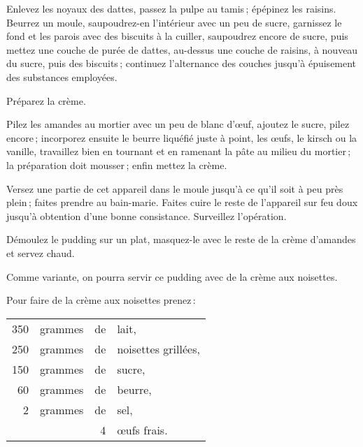 Enlevez les noyaux des dattes, passez la pulpe au tamis ; épépinez les raisins.
Beurrez un moule, saupoudrez-en l'intérieur avec un peu de sucre, garnissez le
fond et les parois avec des biscuits à la cuiller, saupoudrez encore de sucre,
puis mettez une couche de purée de dattes, au-dessus une couche de raisins,
à nouveau du sucre, puis des biscuits ; continuez l'alternance des couches
jusqu'à épuisement des substances employées.

Préparez la crème.

Pilez les amandes au mortier avec un peu de blanc d'œuf, ajoutez le sucre,
pilez encore ; incorporez ensuite le beurre liquéfié juste à point, les œufs,
le kirsch ou la vanille, travaillez bien en tournant et en ramenant la pâte au
milieu du mortier ; la préparation doit mousser ; enfin mettez la crème.

Versez une partie de cet appareil dans le moule jusqu'à ce qu'il soit à peu
près plein ; faites prendre au bain-marie. Faites cuire le reste de l'appareil
sur feu doux jusqu'à obtention d'une bonne consistance. Surveillez l'opération.

Démoulez le pudding sur un plat, masquez-le avec le reste de la crème
d'amandes et servez chaud.

\sk

Comme variante, on pourra servir ce pudding avec de la crème aux noisettes.

\sk

Pour faire de la crème aux noisettes prenez :

\footnotesize
\begin{longtable}{rrrp{16em}}
    350 & grammes & de & lait,                                                                            \\
    250 & grammes & de & noisettes grillées,                                                              \\
    150 & grammes & de & sucre,                                                                           \\
     60 & grammes & de & beurre,                                                                          \\
      2 & grammes & de & sel,                                                                             \\
        &         &  4 & œufs frais.                                                                      \\
\end{longtable}
\normalsize

